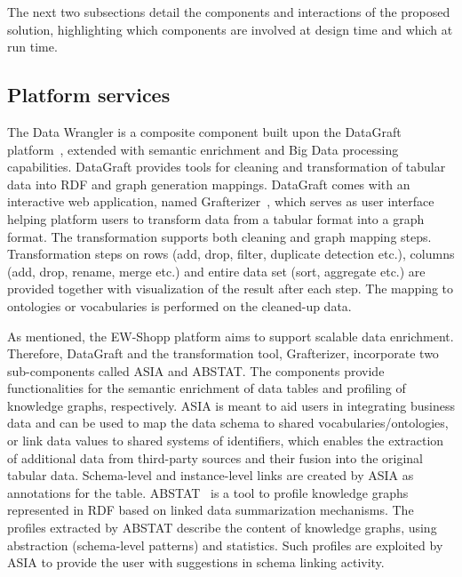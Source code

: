 The next two subsections detail the components and interactions of the proposed solution, highlighting which components are involved at design time and which at run time. 


\subsection{Platform services}

The Data Wrangler is a composite component built upon the DataGraft platform~\cite{roman2016datagraft}, extended with semantic enrichment and Big Data processing capabilities. DataGraft provides tools for cleaning and transformation of tabular data into RDF and graph generation mappings.
DataGraft comes with an interactive web application, named Grafterizer~\cite{sukhobok2016tabular}, which serves as user interface helping platform users to transform data from a tabular format into a graph format. The transformation supports both cleaning and graph mapping steps. Transformation steps on rows (add, drop, filter, duplicate detection etc.), columns (add, drop, rename, merge etc.) and entire data set (sort, aggregate etc.) are provided together with visualization of the result after each step. The mapping to ontologies or vocabularies is performed on the cleaned-up data. 

As mentioned, the EW-Shopp platform aims to support scalable data enrichment. Therefore, DataGraft and the transformation tool, Grafterizer, incorporate two sub-components called ASIA and ABSTAT. The components provide functionalities for the semantic enrichment of data tables and profiling of knowledge graphs, respectively. ASIA is meant to aid users in integrating business data and can be used to map the data schema to shared vocabularies/ontologies, or link data values to shared systems of identifiers, which enables the extraction of additional data from third-party sources and their fusion into the original tabular data. Schema-level and instance-level links are created by ASIA as annotations for the table. ABSTAT~\cite{palmonari2015abstat} is a tool to profile knowledge graphs represented in RDF based on linked data summarization mechanisms. The profiles extracted by ABSTAT describe the content of knowledge graphs, using abstraction (schema-level patterns) and statistics. Such profiles are exploited by ASIA to provide the user with suggestions in schema linking activity. 


